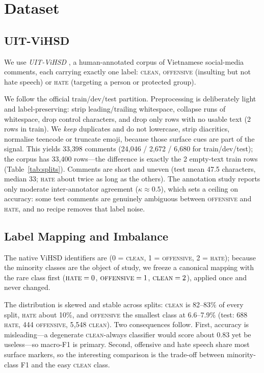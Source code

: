 \section{Dataset}
\label{sec:dataset}

\subsection{UIT-ViHSD}
We use \emph{UIT-ViHSD} \cite{luu2021vihsd}, a human-annotated corpus of Vietnamese
social-media comments, each carrying exactly one label: \textsc{clean},
\textsc{offensive} (insulting but not hate speech) or \textsc{hate} (targeting a
person or protected group).

We follow the official train/dev/test partition.  Preprocessing is deliberately
light and label-preserving: strip leading/trailing whitespace, collapse runs of
whitespace, drop control characters, and drop only rows with no usable text (2
rows in train).  We \emph{keep} duplicates and do not lowercase, strip diacritics,
normalise teencode or truncate emoji, because those surface cues are part of the
signal.  This yields 33{,}398 comments (24{,}046 / 2{,}672 / 6{,}680 for
train/dev/test); the corpus has 33{,}400 rows---the difference is exactly the 2
empty-text train rows (Table~\ref{tab:splits}).  Comments are short and uneven
(test mean 47.5 characters, median 33; \textsc{hate} about twice as long as the
others).  The annotation study reports only moderate inter-annotator agreement
($\kappa\approx0.5$), which sets a ceiling on accuracy: some test comments are
genuinely ambiguous between \textsc{offensive} and \textsc{hate}, and no recipe
removes that label noise.

\subsection{Label Mapping and Imbalance}
\label{sec:imbalance}
The native ViHSD identifiers are (0 = \textsc{clean}, 1 = \textsc{offensive},
2 = \textsc{hate}); because the minority classes are the object of study, we freeze
a canonical mapping with the rare class first ($\textsc{hate}=0$,
$\textsc{offensive}=1$, $\textsc{clean}=2$), applied once and never changed.

The distribution is skewed and stable across splits: \textsc{clean} is 82--83\% of
every split, \textsc{hate} about 10\%, and \textsc{offensive} the smallest class at
6.6--7.9\% (test: 688 \textsc{hate}, 444 \textsc{offensive}, 5{,}548
\textsc{clean}).  Two consequences follow.  First, accuracy is misleading---a
degenerate \textsc{clean}-always classifier would score about $0.83$ yet be
useless---so macro-F1 is primary.  Second, offensive and hate speech share most
surface markers, so the interesting comparison is the trade-off between
minority-class F1 and the easy \textsc{clean} class.

